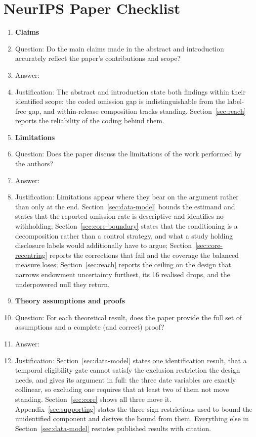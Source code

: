 \section*{NeurIPS Paper Checklist}

\begin{enumerate}

\item {\bf Claims}
    \item[] Question: Do the main claims made in the abstract and introduction accurately reflect the paper's contributions and scope?
    \item[] Answer: \answerYes{}
    \item[] Justification: The abstract and introduction state both findings within their identified scope: the coded omission gap is indistinguishable from the label-free gap, and within-release composition tracks standing. Section~\ref{sec:reach} reports the reliability of the coding behind them.


\item {\bf Limitations}
    \item[] Question: Does the paper discuss the limitations of the work performed by the authors?
    \item[] Answer: \answerYes{}
    \item[] Justification: Limitations appear where they bear on the argument rather than only at the end. Section~\ref{sec:data-model} bounds the estimand and states that the reported omission rate is descriptive and identifies no withholding; Section~\ref{sec:core-boundary} states that the conditioning is a decomposition rather than a control strategy, and what a study holding disclosure labels would additionally have to argue; Section~\ref{sec:core-recentring} reports the corrections that fail and the coverage the balanced measure loses; Section~\ref{sec:reach} reports the ceiling on the design that narrows endowment uncertainty furthest, its 16 realised drops, and the underpowered null they return.


\item {\bf Theory assumptions and proofs}
    \item[] Question: For each theoretical result, does the paper provide the full set of assumptions and a complete (and correct) proof?
    \item[] Answer: \answerYes{}
    \item[] Justification: Section~\ref{sec:data-model} states one identification result, that a temporal eligibility gate cannot satisfy the exclusion restriction the design needs, and gives its argument in full: the three date variables are exactly collinear, so excluding one requires that at least two of them not move standing. Section~\ref{sec:core} shows all three move it. Appendix~\ref{sec:supporting} states the three sign restrictions used to bound the unidentified component and derives the bound from them. Everything else in Section~\ref{sec:data-model} restates published results with citation.



\end{enumerate}
